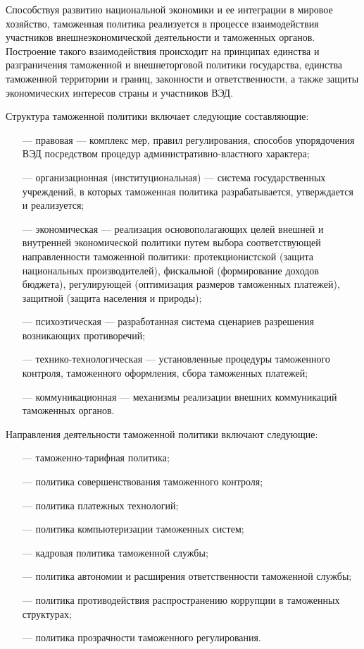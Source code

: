 Способствуя развитию национальной экономики и ее интеграции в мировое хозяйство, таможенная политика реализуется в процессе взаимодействия участников внешнеэкономической деятельности и таможенных органов. Построение такого взаимодействия происходит на принципах единства и разграничения таможенной и внешнеторговой политики государства, единства таможенной территории и границ, законности и ответственности, а также защиты экономических интересов страны и участников ВЭД.

Структура таможенной политики включает следующие составляющие:
\begin{enumerate}
	\item [---] правовая --- комплекс мер, правил регулирования, способов упорядочения ВЭД посредством процедур административно-властного характера;
	\item [---] организационная (институциональная) --- система государственных учреждений, в которых таможенная политика разрабатывается, утверждается и реализуется;
	\item [---] экономическая --- реализация основополагающих целей внешней и внутренней экономической политики путем выбора соответствующей  направленности таможенной политики: протекционистской (защита национальных производителей), фискальной (формирование доходов бюджета), регулирующей (оптимизация размеров таможенных платежей), защитной (защита населения и природы);
	\item [---] психоэтическая --- разработанная система сценариев разрешения возникающих противоречий;
	\item [---] технико-технологическая --- установленные процедуры таможенного контроля, таможенного оформления, сбора таможенных платежей;
	\item [---] коммуникационная --- механизмы реализации внешних коммуникаций таможенных органов.
\end{enumerate}

Направления деятельности таможенной политики включают следующие:
\begin{enumerate}
	\item [---] таможенно-тарифная политика;
	\item [---] политика совершенствования таможенного контроля;
	\item [---] политика платежных технологий;
	\item [---] политика компьютеризации таможенных систем;
	\item [---] кадровая политика таможенной службы;
	\item [---] политика автономии и расширения ответственности таможенной службы;
	\item [---] политика противодействия распространению коррупции в таможенных структурах;
	\item [---] политика прозрачности таможенного регулирования.
\end{enumerate}












